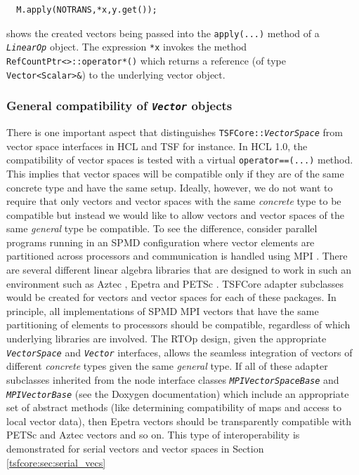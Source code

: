 {\scriptsize\begin{verbatim}
  M.apply(NOTRANS,*x,y.get());
\end{verbatim}}

{}\noindent{}shows the created vectors being passed into the \texttt{apply(\-...)}
method of a \texttt{\textit{LinearOp}} object.  The expression
\texttt{*x} invokes the method
\texttt{RefCountPtr<>\-::operator*()} which returns a reference
(of type \texttt{Vector<Scalar>\&}) to the underlying vector object.

%
\subsubsection{General compatibility of \texttt{\textit{Vector}} objects}
\label{tsfcore:sec:vec_spc_compatibility}
%

There is one important aspect that distinguishes
\texttt{TSFCore\-::\textit{VectorSpace}} from vector space interfaces in
HCL and TSF for instance.  In HCL 1.0, the compatibility of vector
spaces is tested with a virtual \texttt{operator==(...)}  method.
This implies that vector spaces will be compatible only if they are of
the same concrete type and have the same setup.  Ideally, however, we
do not want to require that only vectors and vector spaces with the
same {\em concrete} type to be compatible but instead we would like to
allow vectors and vector spaces of the same {\em general} type be
compatible.  To see the difference, consider parallel programs running
in an SPMD configuration where vector elements are partitioned across
processors and communication is handled using MPI
\cite{ref:mpi}.  There are several different linear algebra libraries
that are designed to work in such an environment such as Aztec
\cite{sd:aztec}, Epetra \cite{ref:Epetra} and PETSc \cite{ref:petsc}.  TSFCore
adapter subclasses would be created for vectors and vector spaces for
each of these packages.  In principle, all implementations of SPMD MPI
vectors that have the same partitioning of elements to processors
should be compatible, regardless of which underlying libraries
are involved.  The RTOp design, given the appropriate
\texttt{\textit{VectorSpace}} and \texttt{\textit{Vector}} interfaces,
allows the seamless integration of vectors of different {\em concrete}
types given the same {\em general} type.  If all of these adapter
subclasses inherited from the node interface classes
\texttt{\textit{MPIVectorSpaceBase}} and
\texttt{\textit{MPIVectorBase}} (see the Doxygen documentation) which
include an appropriate set of abstract methods (like determining
compatibility of maps and access to local vector data), then Epetra
vectors should be transparently compatible with PETSc and Aztec
vectors and so on.  This type of interoperability is demonstrated for
serial vectors and vector spaces in Section
\ref{tsfcore:sec:serial_vecs}

